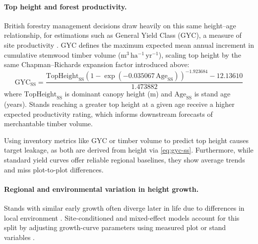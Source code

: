 \paragraph*{Top height and forest productivity.}
British forestry management decisions draw heavily on this same height--age relationship, for estimations such as General Yield Class (GYC), a measure of site productivity \citep{edwards1981Yield_C1_SS,ForestResearch2026Sitka_C1_SS}. GYC defines the maximum expected mean annual increment in cumulative stemwood timber volume ($\mathrm{m^3\,ha^{-1}\,yr^{-1}}$), scaling top height by the same Chapman--Richards expansion factor introduced above:
\begin{equation}
\mathrm{GYC}_{\mathrm{SS}} = \frac{\mathrm{TopHeight}_{\mathrm{SS}} \left(1 - \exp(-0.035067\,\mathrm{Age}_{\mathrm{SS}})\right)^{-1.923684} - 12.13610}{1.473882}
\label{eq:gyc-ss}
\end{equation}
where $\mathrm{TopHeight}_{\mathrm{SS}}$ is dominant canopy height (m) and $\mathrm{Age}_{\mathrm{SS}}$ is stand age (years). Stands reaching a greater top height at a given age receive a higher expected productivity rating, which informs downstream forecasts of merchantable timber volume.

Using inventory metrics like GYC or timber volume to predict top height causes target leakage, as both are derived from height via \eqref{eq:gyc-ss}. Furthermore, while standard yield curves \citep{edwards1981Yield_C1_SS} offer reliable regional baselines, they show average trends and miss plot-to-plot differences.


\paragraph*{Regional and environmental variation in height growth.}
Stands with similar early growth often diverge later in life due to differences in local environment \citep{socha2021Regional_C2_CR}. Site-conditioned and mixed-effect models account for this split by adjusting growth-curve parameters using measured plot or stand variables \citep{scolforo2013Dominant_C2_CR,socha2016Assessment_C2_CR}.

